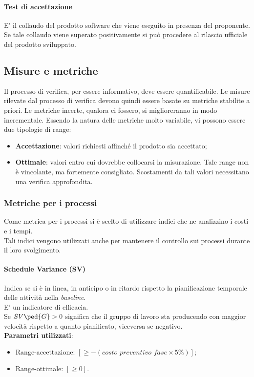 \paragraph{Test di accettazione}
E' il collaudo del prodotto software che viene eseguito in presenza del proponente. Se tale collaudo viene superato positivamente si può procedere al rilascio ufficiale del prodotto sviluppato.

\subsection{Misure e metriche}
Il processo di verifica, per essere informativo, deve essere quantificabile. Le misure rilevate dal processo di verifica devono quindi essere basate su metriche stabilite a priori. Le metriche incerte, qualora ci fossero, si miglioreranno in modo incrementale. Essendo la natura delle metriche molto variabile, vi possono essere due tipologie di range:
\begin{itemize}
\item \textbf{Accettazione}: valori richiesti affinché il prodotto sia accettato;
\item \textbf{Ottimale}: valori entro cui dovrebbe collocarsi la misurazione. Tale range non è vincolante, ma fortemente consigliato. Scostamenti da tali valori necessitano una verifica approfondita.
\end{itemize}

\subsubsection{Metriche per i processi}
Come metrica per i processi si è scelto di utilizzare indici che ne analizzino i costi e i tempi.\\
Tali indici vengono utilizzati anche per mantenere il controllo sui processi durante il loro svolgimento.

\paragraph{Schedule Variance (SV)}
Indica se si è in linea, in anticipo o in ritardo rispetto la pianificazione temporale delle attività nella \textit{baseline}.\\
E' un indicatore di efficacia.\\
Se $SV\ped{G} > 0$ significa che il gruppo di lavoro sta producendo con maggior velocità rispetto a quanto pianificato, viceversa se negativo.\\
\textbf{Parametri utilizzati}:
\begin{itemize}
\item Range-accettazione: $[\geq-(\textit{costo preventivo fase}\times5\%)]$;
\item Range-ottimale: $[\geq0]$.
\end{itemize}

